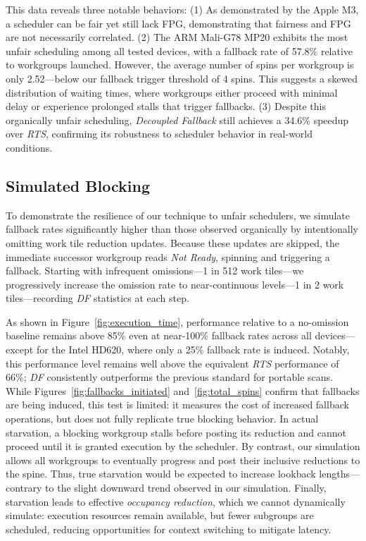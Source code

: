 \documentclass[sigconf,screen]{acmart}
\begin{document}
This data reveals three notable behaviors: (1) As demonstrated by the Apple M3, a scheduler can be fair yet still lack FPG, demonstrating that fairness and FPG are not necessarily correlated. (2) The ARM Mali-G78 MP20 exhibits the most unfair scheduling among all tested devices, with a fallback rate of 57.8\% relative to workgroups launched. However, the average number of spins per workgroup is only 2.52---below our fallback trigger threshold of 4 spins. This suggests a skewed distribution of waiting times, where workgroups either proceed with minimal delay or experience prolonged stalls that trigger fallbacks. (3) Despite this organically unfair scheduling, \emph{Decoupled Fallback} still achieves a 34.6\% speedup over \emph{RTS}, confirming its robustness to scheduler behavior in real-world conditions.

\subsection{Simulated Blocking}%
\label{sec:Sim-Blocking}
To demonstrate the resilience of our technique to unfair schedulers, we simulate fallback rates significantly higher than those observed organically by intentionally omitting work tile reduction updates. Because these updates are skipped, the immediate successor workgroup reads \emph{Not Ready}, spinning and triggering a fallback. Starting with infrequent omissions---1 in 512 work tiles---we progressively increase the omission rate to near-continuous levels---1 in 2 work tiles---recording \emph{DF} statistics at each step.

As shown in Figure~\ref{fig:execution_time}, performance relative to a no-omission baseline remains above 85\% even at near-100\% fallback rates across all devices—except for the Intel HD620, where only a 25\% fallback rate is induced. Notably, this performance level remains well above the equivalent \emph{RTS} performance of 66\%; \emph{DF} consistently outperforms the previous standard for portable scans. While Figures~\ref{fig:fallbacks_initiated} and~\ref{fig:total_spins} confirm that fallbacks are being induced, this test is limited: it measures the cost of increased fallback operations, but does not fully replicate true blocking behavior. In actual starvation, a blocking workgroup stalls before posting its reduction and cannot proceed until it is granted execution by the scheduler. By contrast, our simulation allows all workgroups to eventually progress and post their inclusive reductions to the spine. Thus, true starvation would be expected to increase lookback lengths—contrary to the slight downward trend observed in our simulation. Finally, starvation leads to effective \emph{occupancy reduction}, which we cannot dynamically simulate: execution resources remain available, but fewer subgroups are scheduled, reducing opportunities for context switching to mitigate latency.
\end{document}
